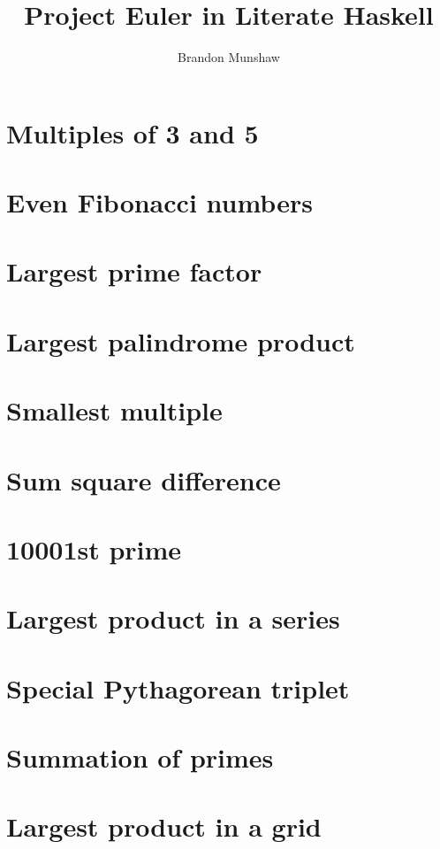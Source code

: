 \documentclass[b5paper,oneside]{book}
\title{Project Euler in Literate Haskell}
\author{Brandon Munshaw}
\date{}
\begin{document}
\maketitle
\tableofcontents

\chapter{Multiples of 3 and 5}


\chapter{Even Fibonacci numbers}


\chapter{Largest prime factor}


\chapter{Largest palindrome product}


\chapter{Smallest multiple}


\chapter{Sum square difference}


\chapter{10001st prime}


\chapter{Largest product in a series}


\chapter{Special Pythagorean triplet}


\chapter{Summation of primes}


\chapter{Largest product in a grid}

\end{document}
